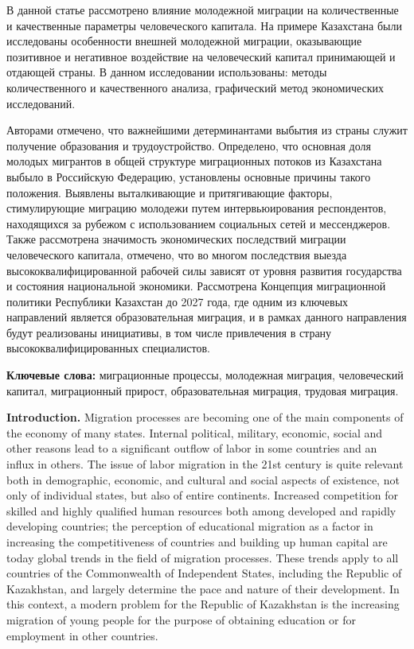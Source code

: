 В данной статье рассмотрено влияние молодежной миграции на
количественные и качественные параметры человеческого капитала. На
примере Казахстана были исследованы особенности внешней молодежной
миграции, оказывающие позитивное и негативное воздействие на
человеческий капитал принимающей и отдающей страны. В данном
исследовании использованы: методы количественного и качественного
анализа, графический метод экономических исследований.

Авторами отмечено, что важнейшими детерминантами выбытия из страны
служит получение образования и трудоустройство. Определено, что основная
доля молодых мигрантов в общей структуре миграционных потоков из
Казахстана выбыло в Российскую Федерацию, установлены основные причины
такого положения. Выявлены выталкивающие и притягивающие факторы,
стимулирующие миграцию молодежи путем интервьюирования респондентов,
находящихся за рубежом с использованием социальных сетей и мессенджеров.
Также рассмотрена значимость экономических последствий миграции
человеческого капитала, отмечено, что во многом последствия выезда
высококвалифицированной рабочей силы зависят от уровня развития
государства и состояния национальной экономики. Рассмотрена Концепция
миграционной политики Республики Казахстан до 2027 года, где одним из
ключевых направлений является образовательная миграция, и в рамках
данного направления будут реализованы инициативы, в том числе
привлечения в страну высококвалифицированных специалистов.

{\bfseries Ключевые слова:} миграционные процессы, молодежная миграция,
человеческий капитал, миграционный прирост, образовательная миграция,
трудовая миграция.

{\bfseries Introduction.} Migration processes are becoming one of the main
components of the economy of many states. Internal political, military,
economic, social and other reasons lead to a significant outflow of
labor in some countries and an influx in others. The issue of labor
migration in the 21st century is quite relevant both in demographic,
economic, and cultural and social aspects of existence, not only of
individual states, but also of entire continents. Increased competition
for skilled and highly qualified human resources both among developed
and rapidly developing countries; the perception of educational
migration as a factor in increasing the competitiveness of countries and
building up human capital are today global trends in the field of
migration processes. These trends apply to all countries of the
Commonwealth of Independent States, including the Republic of
Kazakhstan, and largely determine the pace and nature of their
development. In this context, a modern problem for the Republic of
Kazakhstan is the increasing migration of young people for the purpose
of obtaining education or for employment in other countries.

